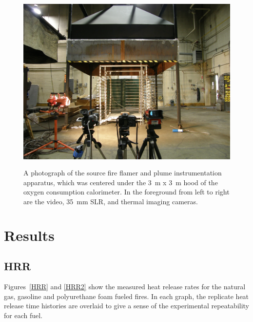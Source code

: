\documentclass[twoside]{uocthesis}
\begin{document}
{\begin{figure}
  \centering
  \includegraphics[width=\textwidth]{../Figures/Source_Fire_Flamer}\\
  \caption[A photograph of the source fire flame and plume instrumentation apparatus]{A photograph of the source fire flamer and plume instrumentation apparatus, which was centered under the 3~m x 3~m hood of the oxygen consumption calorimeter.  In the foreground from left to right are the video, 35~mm SLR, and thermal imaging cameras.}
  \label{Fire_Flamer}
\end{figure}

\section{Results}

\subsection{HRR}

Figures~\ref{HRR} and \ref{HRR2} show the measured heat release rates for the natural gas, gasoline and polyurethane foam fueled fires. In each graph, the replicate heat release time histories are overlaid to give a sense of the experimental repeatability for each fuel.

}
\end{document}
